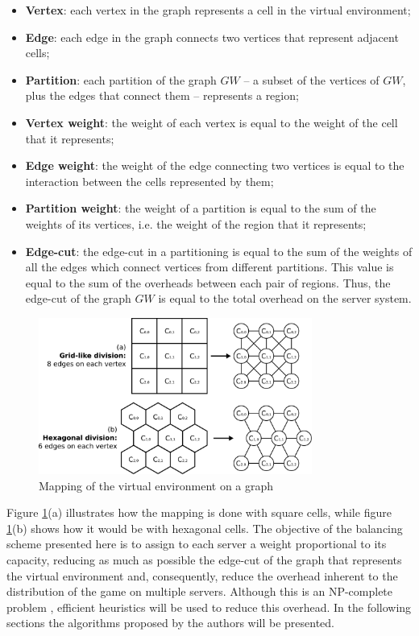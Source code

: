 \begin{itemize}
	\item \textbf{Vertex}: each vertex in the graph represents a cell in the virtual environment;
	\item \textbf{Edge}: each edge in the graph connects two vertices that represent adjacent cells;
	\item \textbf{Partition}: each partition of the graph $GW$ -- a subset of the vertices of $GW$, plus the edges that connect them -- represents a region;
	\item \textbf{Vertex weight}: the weight of each vertex is equal to the weight of the cell that it represents;
	\item \textbf{Edge weight}: the weight of the edge connecting two vertices is equal to the interaction between the cells represented by them;
	\item \textbf{Partition weight}: the weight of a partition is equal to the sum of the weights of its vertices, i.e. the weight of the region that it represents;
	\item \textbf{Edge-cut}: the edge-cut in a partitioning is equal to the sum of the weights of all the edges which connect vertices from different partitions. This value is equal to the sum of the overheads between each pair of regions. Thus, the edge-cut of the graph $GW$ is equal to the total overhead on the server system.
\end{itemize}

\begin{figure}
	\centering
	\includegraphics[width=0.8\textwidth]{images/mapping}
	\caption{Mapping of the virtual environment on a graph}
	\label{fig:mapping}
\end{figure}

Figure \ref{fig:mapping}(a) illustrates how the mapping is done with square cells, while figure \ref{fig:mapping}(b) shows how it would be with hexagonal cells. The objective of the balancing scheme presented here is to assign to each server a weight proportional to its capacity, reducing as much as possible the edge-cut of the graph that represents the virtual environment and, consequently, reduce the overhead inherent to the distribution of the game on multiple servers. Although this is an NP-complete problem \cite{feder1999cgp}, efficient heuristics will be used to reduce this overhead. In the following sections the algorithms proposed by the authors will be presented.

